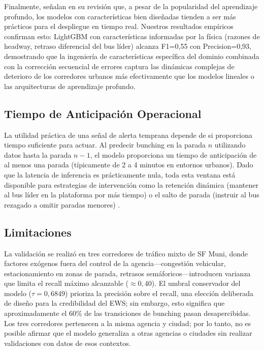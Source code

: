 \documentclass[fleqn,10pt,lineno]{wlpeerj}
\begin{document}
Finalmente, \citet{21} se\~nalan en su revisi\'on que, a pesar de la popularidad del aprendizaje profundo, los modelos con caracter\'isticas bien dise\~nadas tienden a ser m\'as pr\'acticos para el despliegue en tiempo real. Nuestros resultados emp\'iricos confirman esto: LightGBM con caracter\'isticas informadas por la f\'isica (razones de headway, retraso diferencial del bus l\'ider) alcanza F1=0,55 con Precision=0,93, demostrando que la ingenier\'ia de caracter\'isticas espec\'ifica del dominio combinada con la correcci\'on secuencial de errores captura las din\'amicas complejas de deterioro de los corredores urbanos m\'as efectivamente que los modelos lineales o las arquitecturas de aprendizaje profundo.

\subsection{Tiempo de Anticipaci\'on Operacional}

La utilidad pr\'actica de una se\~nal de alerta temprana depende de si proporciona tiempo suficiente para actuar. Al predecir bunching en la parada $n$ utilizando datos hasta la parada $n{-}1$, el modelo proporciona un tiempo de anticipaci\'on de al menos una parada (t\'ipicamente de 2 a 4 minutos en entornos urbanos). Dado que la latencia de inferencia es pr\'acticamente nula, toda esta ventana est\'a disponible para estrategias de intervenci\'on como la retenci\'on din\'amica (mantener al bus l\'ider en la plataforma por m\'as tiempo) o el salto de parada (instruir al bus rezagado a omitir paradas menores) \citep{10}.

\subsection{Limitaciones}

La validaci\'on se realiz\'o en tres corredores de tr\'afico mixto de SF Muni, donde factores ex\'ogenos fuera del control de la agencia---congesti\'on vehicular, estacionamiento en zonas de parada, retrasos sem\'aforicos---introducen varianza que limita el recall m\'aximo alcanzable ($\approx 0,40$). El umbral conservador del modelo ($\tau=0,6849$) prioriza la precisi\'on sobre el recall, una elecci\'on deliberada de dise\~no para la credibilidad del EWS; sin embargo, esto significa que aproximadamente el 60\% de las transiciones de bunching pasan desapercibidas. Los tres corredores pertenecen a la misma agencia y ciudad; por lo tanto, no es posible afirmar que el modelo generaliza a otras agencias o ciudades sin realizar validaciones con datos de esos contextos.
\end{document}
